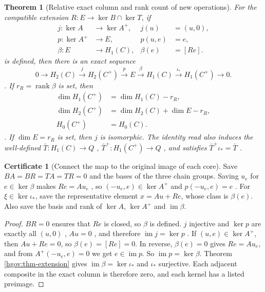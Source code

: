 \documentclass[12pt,a4paper,openany,notitlepage]{report}
\theoremstyle{plain}
\newtheorem{theorem}{Theorem}[chapter]
\theoremstyle{definition}
\newtheorem*{certificate}{Certificate}
\theoremstyle{remark}
\begin{document}
\begin{CJK*}
\begin{theorem}
[Relative exact column and rank count of new operations]\label{exp:hom:relative-exact}
For the compatible extension $R:E\to\ker B\cap\ker T$, if \[
 \begin{aligned}
 j:\ker A&\longrightarrow\ker A^+,&j(u)&=(u,0),\\
 p:\ker A^+&\longrightarrow E,&p(u,e)&=e,\\
 \beta:E&\longrightarrow H_1(C),&\beta(e)&=[Re].
 \end{aligned}
\] is defined, then there is an exact sequence \[
 0\longrightarrow H_2(C)
 \xrightarrow{j}H_2(C^+)
 \xrightarrow{p}E
 \xrightarrow{\beta}H_1(C)
 \xrightarrow{\iota_*}H_1(C^+)
 \longrightarrow0.
\]. If $r_R=\operatorname{rank}\beta$ is set, then \[
 \begin{aligned}
 \dim H_1(C^+)&=\dim H_1(C)-r_R,\\
 \dim H_2(C^+)&=\dim H_2(C)+\dim E-r_R,\\
 H_0(C^+)&=H_0(C).
 \end{aligned}
\]. If $\dim E=r_R$ is set, then $j$ is isomorphic. The identity read also induces the well-defined $\bar T:H_1(C)\to Q$ , $\bar T^+:H_1(C^+)\to Q$ , and satisfies $\bar T^+\iota_*=\bar T$ .\end{theorem}
\begin{certificate}
[Connect the map to the original image of each core]Save $BA=BR=TA=TR=0$ and the bases of the three chain groups. Saving $u_e$ for $e\in\ker\beta$ makes $Re=Au_e$ , so $(-u_e,e)\in\ker A^+$ and $p(-u_e,e)=e$ . For $\xi\in\ker\iota_*$, save the representative element $x=Au+Re$, whose class is $\beta(e)$. Also save the basis and rank of $\ker A$, $\ker A^+$ and $\operatorname{im}\beta$.\end{certificate}
\begin{proof}
$BR=0$ ensures that $Re$ is closed, so $\beta$ is defined. $j$ injective and $\ker p$ are exactly all $(u,0)$ , $Au=0$ , and therefore $\operatorname{im}j=\ker p$ . If $(u,e)\in\ker A^+$, then $Au+Re=0$, so $\beta(e)=[Re]=0$. In reverse, $\beta(e)=0$ gives $Re=Au_e$, and from $A^+(-u_e,e)=0$ we get $e\in\operatorname{im}p$. So $\operatorname{im}p=\ker\beta$. Theorem ~ \ref{hgov:thm-extension} gives $\operatorname{im}\beta=\ker\iota_*$ and $\iota_*$ surjective. Each adjacent composite in the exact column is therefore zero, and each kernel has a listed preimage.


\end{proof}
\end{CJK*}
\end{document}
